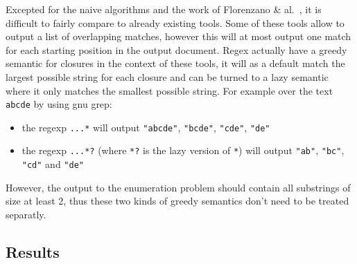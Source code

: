 \documentclass[12px]{article}
\begin{document}
      Excepted for the naive algorithms and the work of Florenzano \&
      al.~, it is difficult to fairly compare to already
      existing tools. Some of these tools allow to output a list of overlapping
      matches, however this will at most output one match for each starting
      position in the output document. Regex actually have a greedy semantic
      for closures in the context of these tools, it will as a default match
      the largest possible string for each closure and can be turned to a lazy
      semantic where it only matches the smallest possible string. For
      example over the text \texttt{abcde} by using gnu grep:
        \begin{itemize}
          \item the regexp \texttt{...*} will output \texttt{"abcde"},
            \texttt{"bcde"}, \texttt{"cde"}, \texttt{"de"}
          \item the regexp \texttt{...*?} (where \texttt{*?} is the lazy
            version of \texttt{*}) will output \texttt{"ab"}, \texttt{"bc"},
            \texttt{"cd"} and \texttt{"de"}
        \end{itemize}
      However, the output to the enumeration problem should contain all
      substrings of size at least 2, thus these two kinds of greedy semantics
      don't need to be treated separatly.

    \subsection{Results}


  \pagebreak
  
  
\end{document}
